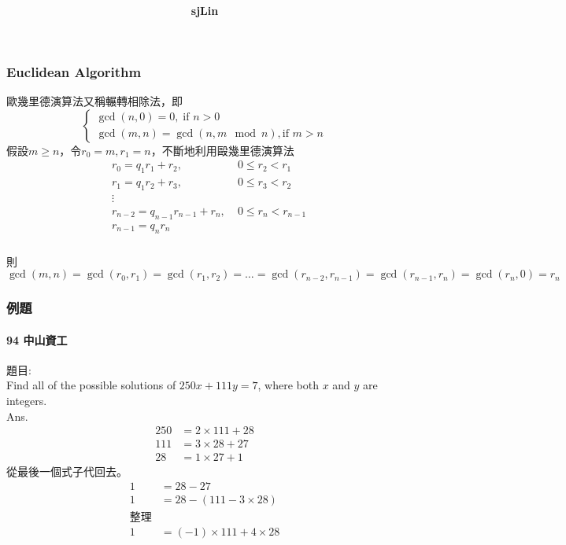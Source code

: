 \documentclass{beamer}
\title{\textbf{}}
\author{\textbf{sjLin}}
\begin{document}
{\selectfont
\begin{CJK*}{UTF8}{bkai}






\begin{frame}
\frametitle{Euclidean Algorithm}
歐幾里德演算法又稱輾轉相除法，即
\[
\begin{cases}
	\gcd(n,0)=0, \;\text{if } n>0 \\
	\gcd(m,n)=\gcd(n,m\mod n), \text{if } m>n
\end{cases}
\]
假設$m\geq n$，令$r_0=m,r_1=n$，不斷地利用毆幾里德演算法
\begin{align*}
	&r_0=q_1r_1+r_2,\; &0\leq r_2<r_1\\
	&r_1=q_1r_2+r_3,\; &0\leq r_3<r_2\\
	&\vdots\\	
	&r_{n-2}=q_{n-1}r_{n-1}+r_n,\; &0\leq r_n<r_{n-1}\\
	      &r_{n-1}=q_nr_n&
\end{align*}
\end{frame}

\begin{frame}
\frametitle{}
則$\gcd(m,n)=\gcd(r_0,r_1)=\gcd(r_1,r_2)=\dots=\gcd(r_{n-2},r_{n-1})=\gcd(r_{n-1},r_n)=\gcd(r_n,0)=r_n$
\end{frame}
\begin{frame}
\frametitle{例題}
\framesubtitle{94 中山資工}
題目:\\
Find all of the possible solutions of $250x+111y=7$, where both $x$ and $y$ are integers.\\[10pt]
Ans.
\begin{align*}
250&=2\times 111 +28\\
111&=3\times 28 + 27\\
28 &= 1\times 27 + 1
\end{align*}
從最後一個式子代回去。
\begin{align*}
1 &= 28 - 27\\
1 &= 28 - (111-3\times 28)\\
\text{整理}\\
1 &= (-1)\times111+4\times 28
\end{align*}
	

\end{frame}
\end{CJK*}}
\end{document}

